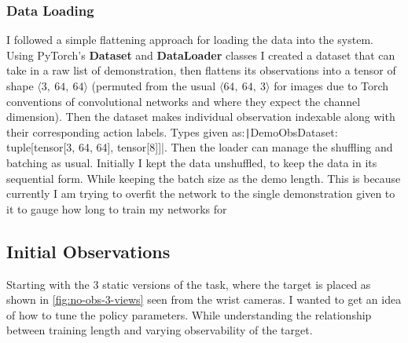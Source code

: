 \subsubsection{Data Loading}\label{subsec:reach-data-loading}
I followed a simple flattening approach for loading the data into the system. Using PyTorch's \textbf{Dataset} and \textbf{DataLoader} classes I created a dataset that can take in a raw list of demonstration, then flattens its observations into a tensor of shape \(\langle 3,~64,~64 \rangle \) (permuted from the usual \(\langle 64,~64,~3 \rangle \) for images due to Torch conventions of convolutional networks and where they expect the channel  dimension). Then the dataset makes individual observation indexable along with their corresponding action labels. Types given as:\texttt|DemoObsDataset: tuple[tensor[3,  64, 64], tensor[8]]|. Then the loader can manage the shuffling and batching as usual. Initially I kept the data unshuffled, to keep the data in its sequential form. While keeping the batch size as the demo length. This is because currently I am trying to overfit the network to the single demonstration given to it to gauge how long to train my networks for

\subsection{Initial Observations}
Starting with the 3 static versions of the task, where the target is placed as shown in \ref{fig:no-obs-3-views} seen from the wrist cameras. I wanted to get an idea of how to tune the policy parameters. While understanding the relationship between training length and varying observability of the target.

